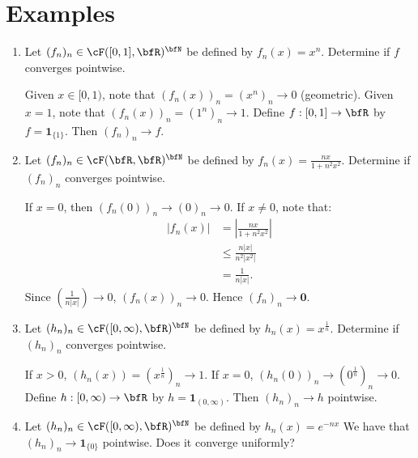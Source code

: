 \section*{Examples}
    \begin{enumerate}[label = (\arabic*)]
        \item Let $(f_n)_n \in \cF([0,1],\bfR)^\bfN$ be defined by $f_n(x) = x^n$. Determine if $f$ converges pointwise.
            {\color{red} \begin{solution}
                Given $x \in [0,1)$, note that $(f_n(x))_n = (x^n)_n \rightarrow 0$ (geometric). Given $x = 1$, note that $(f_n(x))_n = (1^n)_n \rightarrow 1$. Define $f:[0,1] \rightarrow \bfR$ by $f = \mathbf{1}_{\{1\}}$. Then $(f_n)_n \rightarrow f$.
            \end{solution}}

        \item Let $(f_n)_n \in \cF(\bfR,\bfR)^\bfN$ be defined by $f_n(x) = \frac{nx}{1 + n^2 x^2}$. Determine if $(f_n)_n$ converges pointwise.
            {\color{red} \begin{solution}
                If $x = 0$, then $(f_n(0))_n \rightarrow (0)_n \rightarrow 0$. If $x \neq 0$, note that:
                    \begin{equation*}
                    \begin{split}
                        |f_n(x)| 
                        & = \left|\frac{nx}{1 + n^2 x^2}\right| \\
                        & \leq \frac{n|x|}{n^2|x^2|} \\
                        & = \frac{1}{n|x|}.
                    \end{split}
                    \end{equation*}
                Since $\left(\frac{1}{n|x|}\right) \rightarrow 0$, $(f_n(x))_n \rightarrow 0$. Hence $(f_n)_n \rightarrow \mathbf{0}$.
            \end{solution}}
        
        \item Let $(h_n)_n \in \cF([0,\infty),\bfR)^\bfN$ be defined by $h_n(x) = x^{\frac{1}{n}}$. Determine if $(h_n)_n$ converges pointwise.
            {\color{red} \begin{solution}
                If $x > 0$, $(h_n(x)) = (x^{\frac{1}{n}})_n \rightarrow 1$. If $x = 0$, $(h_n(0))_n \rightarrow (0^\frac{1}{n})_n \rightarrow 0$. Define $h:[0,\infty) \rightarrow \bfR$ by $h = \mathbf{1}_{(0,\infty)}$. Then $(h_n)_n \rightarrow h$ pointwise.
            \end{solution}}

        \item Let $(h_n)_n \in \cF([0,\infty),\bfR)^\bfN$ be defined by $h_n(x) = e^{-nx}$ We have that $(h_n)_n \rightarrow \mathbf{1}_{\{0\}}$ pointwise. Does it converge uniformly?
            \begin{solution}
                
            \end{solution}
    \end{enumerate}